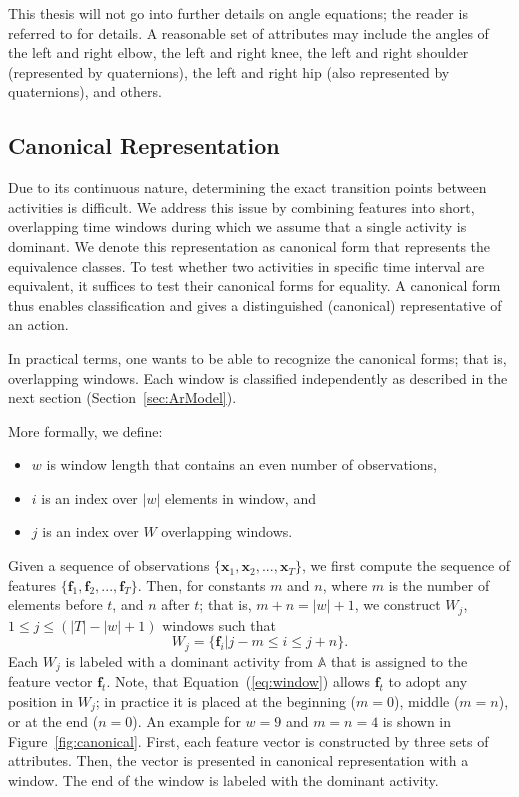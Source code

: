 This thesis will not go into further details on angle equations; the reader is referred to \cite{Lustrek2008report} for details. A reasonable set of attributes may include the angles of the left and right elbow, the left and right knee, the left and right shoulder (represented by quaternions), the left and right hip (also represented by quaternions), and others.


\subsection{Canonical Representation}
Due to its continuous nature, determining the exact transition points between activities is difficult. We address this issue by combining features into short, overlapping time windows during which we assume that a single activity is dominant. We denote this representation as canonical form that represents the equivalence classes. To test whether two activities in specific time interval are equivalent, it suffices to test their canonical forms for equality. A canonical form thus enables classification and gives a distinguished (canonical) representative of an action.

In practical terms, one wants to be able to recognize the canonical forms; that is, overlapping windows. Each window is classified independently as described in the next section (Section~\ref{sec:ArModel}).

More formally, we define:
\begin{itemize}
	\item $w$ is window length that contains an even number of observations,
	\item $i$ is an index over $|w|$ elements in window, and
	\item $j$ is an index over $W$ overlapping windows.
\end{itemize}

Given a sequence of observations $\{\mathbf{x}_1, \mathbf{x}_2, ..., \mathbf{x}_T\}$, we first compute the sequence of features $\{\mathbf{f}_1, \mathbf{f}_2, ..., \mathbf{f}_T\}$. Then, for constants $m$ and $n$, where $m$ is the number of elements before $t$, and $n$ after $t$; that is, $m+n=|w|+1$, we construct $W_j$, $1 \leq j \leq (|T|-|w|+1)$ windows such that
\begin{equation}
\label{eq:window}
W_j = \{\mathbf{f}_i | j - m \leq i \leq j + n \}.
\end{equation}
Each $W_j$ is labeled with a dominant activity from $\mathbb{A}$ that is assigned to the feature vector $\mathbf{f}_t$. Note, that Equation~(\ref{eq:window}) allows $\mathbf{f}_t$ to adopt any position in $W_j$; in practice it is placed at the beginning ($m=0$), middle ($m=n$), or at the end ($n=0$).
%
An example for $w=9$ and $m=n=4$ is shown in Figure~\ref{fig:canonical}. First, each feature vector is constructed by three sets of attributes. Then, the vector is presented in canonical representation with a window. The end of the window is labeled with the dominant activity.

